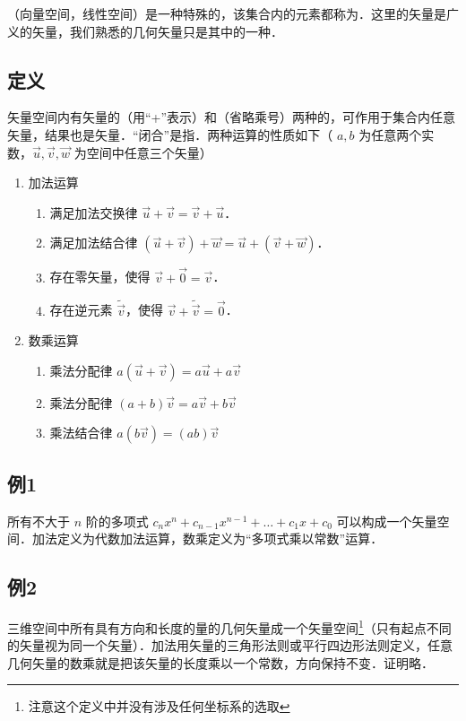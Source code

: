 
（向量空间，线性空间）是一种特殊的，该集合内的元素都称为．这里的矢量是广义的矢量，我们熟悉的几何矢量只是其中的一种．

\subsection{定义}
矢量空间内有矢量的（用“+”表示）和（省略乘号）两种的，可作用于集合内任意矢量，结果也是矢量．“闭合”是指．两种运算的性质如下（ $a,b$ 为任意两个实数，$\vec u,\vec v,\vec w$ 为空间中任意三个矢量）
\begin{enumerate}
\item 加法运算
\begin{enumerate}
\item 满足加法交换律 $\vec u + \vec v = \vec v + \vec u$．
\item 满足加法结合律 $(\vec u + \vec v) + \vec w = \vec u + (\vec v + \vec w)$．
\item 存在零矢量，使得 $\vec v + \vec 0 = \vec v$．
\item 存在逆元素 $\tilde{\vec v}$，使得 $\vec v + \tilde{\vec v} = \vec 0$．
\end{enumerate}

\item 数乘运算
\begin{enumerate}
\item 乘法分配律 $a(\vec u + \vec v) = a\vec u + a\vec v$ 
\item 乘法分配律 $(a + b)\vec v = a\vec v + b\vec v$
\item 乘法结合律 $a (b \vec v) = (ab) \vec v$
\end{enumerate}
\end{enumerate}

\subsection{例1}
所有不大于 $n$ 阶的多项式 $c_n x^n + c_{n-1} x^{n-1} + \dots + c_1 x + c_0$ 可以构成一个矢量空间．加法定义为代数加法运算，数乘定义为“多项式乘以常数”运算． 

\subsection{例2}
三维空间中所有具有方向和长度的量的几何矢量成一个矢量空间\footnote{注意这个定义中并没有涉及任何坐标系的选取}（只有起点不同的矢量视为同一个矢量）．加法用矢量的三角形法则或平行四边形法则定义，任意几何矢量的数乘就是把该矢量的长度乘以一个常数，方向保持不变．证明略．

